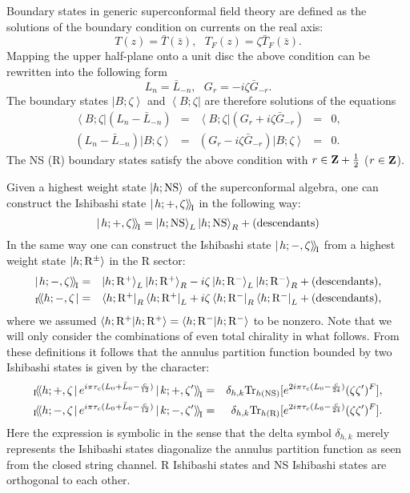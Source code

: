 \documentclass[a4paper,12pt]{article}
\newcommand{\vev}[1]{\left<{#1}\right>}
\newcommand{\bra}[1]{\left<{#1}\right|}
\newcommand{\ket}[1]{\left|{#1}\right>}
\newcommand{\ibra}[1]{_{\rm I}\!\!\left<\!\left<{#1}\right.\right|}
\newcommand{\iket}[1]{\left|\left.{#1}\right>\!\right>_{\rm \!I}}
\newcommand{\NS}{{\rm NS}}
\newcommand{\R}{{\rm R}}
\begin{document}
   Boundary states in generic superconformal field theory are
 defined as the solutions of the boundary condition on currents
 on the real axis:
\begin{equation}
  T(z)=\bar{T}(\bar{z}),~~~
  T_F(z)=\zeta\bar{T}_F(\bar{z}).
\end{equation}
 Mapping the upper half-plane onto a unit disc the above condition
 can be rewritten into the following form
\begin{equation}
  L_n=\bar{L}_{-n},~~~
  G_r=-i\zeta\bar{G}_{-r}.
\end{equation}
 The boundary states $\ket{B;\zeta}$ and $\bra{B;\zeta}$ are
 therefore solutions of the equations
\begin{equation}
\begin{array}{rcrcl}
  \bra{B;\zeta}(L_n-\bar{L}_{-n})&=&
  \bra{B;\zeta}(G_r+i\zeta\bar{G}_{-r})&=&0,\\
  (L_n-\bar{L}_{-n})\ket{B;\zeta}&=&
  (G_r-i\zeta\bar{G}_{-r})\ket{B;\zeta}&=&0.
\end{array}
\end{equation}
 The NS (R) boundary states satisfy the above condition with
 $r\in{\bf Z}+\frac{1}{2}$ ($r\in{\bf Z}$).

 Given a highest weight state $\ket{h;\NS}$ of
 the superconformal algebra, one can construct the Ishibashi state
 $\iket{h;+,\zeta}$ in the following way:
\begin{equation}
  \iket{h;+,\zeta}=\ket{h;\NS}_L\ket{h;\NS}_R + (\mbox{descendants})
\end{equation}
 In the same way one can construct the Ishibashi state
 $\iket{h;-,\zeta}$ from a highest weight state $\ket{h;\R^\pm}$
 in the R sector:
\begin{eqnarray}
  \iket{h;-,\zeta}&=&
  \textstyle
  \ket{h;\R^+}_L\ket{h;\R^+}_R -i\zeta
  \ket{h;\R^-}_L\ket{h;\R^-}_R +
  (\mbox{descendants}), \nonumber \\
  \ibra{h;-,\zeta}&=&
  \textstyle
  \bra{h;\R^+}_R\bra{h;\R^+}_L +i\zeta
  \bra{h;\R^-}_R\bra{h;\R^-}_L +
  (\mbox{descendants}),
\label{IR}
\end{eqnarray}
 where we assumed
 $\vev{h;\R^+|h;\R^+}=\vev{h;\R^-|h;\R^-}$ to be nonzero.
 Note that we will only consider the combinations of even total
 chirality in what follows.
 From these definitions it follows that the annulus partition function
 bounded by two Ishibashi states is given by the character:
\begin{eqnarray}
  \ibra{h;+,\zeta}e^{i\pi\tau_c(L_0+\bar{L}_0-\frac{c}{12})}
  \iket{k;+,\zeta'}
 &=& \delta_{h,k}{\rm Tr}_{h(\NS)}
   [e^{2i\pi\tau_c(L_0-\frac{c}{24})}
    (\zeta\zeta')^F], \nonumber\\
  \ibra{h;-,\zeta}e^{i\pi\tau_c(L_0+\bar{L}_0-\frac{c}{12})}
  \iket{k;-,\zeta'}
 &=& \delta_{h,k}{\rm Tr}_{h(\R)}
   [e^{2i\pi\tau_c(L_0-\frac{c}{24})}
   (\zeta\zeta')^F].
\end{eqnarray}
 Here the expression is symbolic in the sense that
 the delta symbol $\delta_{h,k}$  merely represents
 the Ishibashi states diagonalize the annulus partition function
 as seen from the closed string channel.
 R Ishibashi states and NS Ishibashi states are orthogonal to each
 other.
\end{document}
